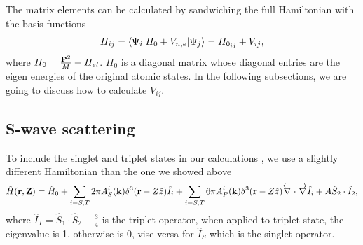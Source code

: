 \documentclass[british,english]{article}
\numberwithin{equation}{section}
\numberwithin{figure}{section}
\begin{document}
The matrix elements can be calculated by sandwiching the full Hamiltonian with the basis functions
\begin{equation}
H_{ij}=\braket{\Psi_i|H_0+V_{n,e}|\Psi_j}=H_{0_{ij}}+V_{ij},
\end{equation}
where $H_0 =\frac{{\bf P}^{2}}{M}+H_{el}$. $H_0$ is a diagonal matrix whose diagonal entries are the eigen energies of the original atomic states. In the following subsections, we are going to discuss how to calculate $V_{ij}$.
\subsection{S-wave scattering}
To include the singlet and triplet states in our calculations \cite{}, we use a slightly different Hamiltonian than the one we showed above
\begin{equation}
\hat H({\bf r, Z})=\hat H_0+\sum_{i=S,T}2\pi A^i_S({\bf k})\delta^3({\bf r}-Z\hat z)\hat I_i+\sum_{i=S,T}6\pi A_P^i({\bf k})\delta^3({\bf r}-Z\hat z)\overleftarrow{\nabla}\cdot\overrightarrow\nabla\hat I_i+A\hat S_2\cdot \hat I_2,
\end{equation}
 where $\hat I_T=\hat S_1\cdot \hat S_2+\frac 34$ is the triplet operator, when applied to triplet state, the eigenvalue is 1, otherwise is 0, vise versa for $\hat I_S$ which is the singlet operator.
\end{document}
